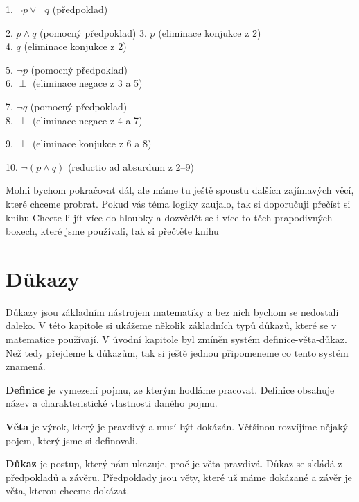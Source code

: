 \begin{example}
  \begin{proofbox}

    1. $\neg p \lor \neg q$ (předpoklad)
    \begin{proofbox}
      2. $p \land q$ (pomocný předpoklad)
      3. $p$ (eliminace konjukce z 2) \\
      4. $q$ (eliminace konjukce z 2)
      \begin{proofbox}
        5. $\neg p$ (pomocný předpoklad) \\
        6. $\perp$ (eliminace negace z 3 a 5)
      \end{proofbox}
      \begin{proofbox}
        7. $\neg q$ (pomocný předpoklad) \\
        8. $\perp$ (eliminace negace z 4 a 7)
      \end{proofbox}
      9. $\perp$ (eliminace konjukce z 6 a 8)
    \end{proofbox}
    10. $\neg(p \land q)$ (reductio ad absurdum z 2--9)
  \end{proofbox}

\end{example}

Mohli bychom pokračovat dál, ale máme tu ještě spoustu dalších zajímavých věcí, které chceme probrat. Pokud vás téma logiky zaujalo, tak si doporučuji přečíst si knihu 
Chcete-li jít více do hloubky a dozvědět se i více to těch prapodivných boxech, které jsme používali, tak si přečtěte knihu
\section{Důkazy}
Důkazy jsou základním nástrojem matematiky a bez nich bychom se nedostali daleko. V této kapitole si ukážeme několik základních typů důkazů, které se v matematice používají. V úvodní kapitole byl zmíněn systém definice-věta-důkaz. Než tedy přejdeme k důkazům, tak si ještě jednou připomeneme co tento systém znamená.

\begin{definitionbox}
  \textbf{Definice} je vymezení pojmu, ze kterým hodláme pracovat. Definice obsahuje název a charakteristické vlastnosti daného pojmu.

  \textbf{Věta} je výrok, který je pravdivý a musí být dokázán. Většinou rozvíjíme nějaký pojem, který jsme si definovali.

  \textbf{Důkaz} je postup, který nám ukazuje, proč je věta pravdivá. Důkaz se skládá z předpokladů a závěru. Předpoklady jsou věty, které už máme dokázané a závěr je věta, kterou chceme dokázat.
\end{definitionbox}

